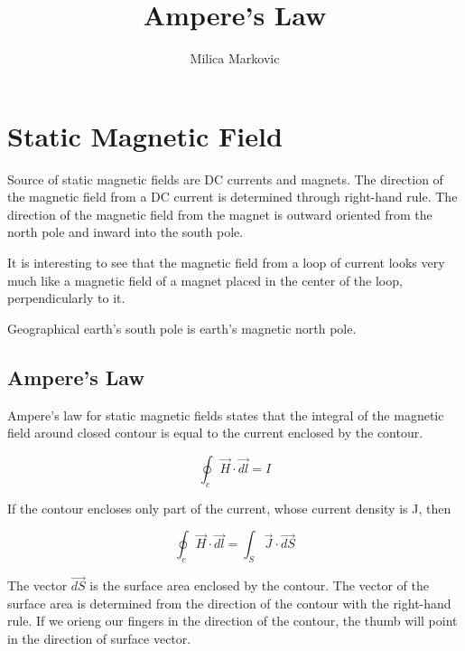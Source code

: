 \documentclass{ximera}
\title{Ampere's Law}
\author{Milica Markovic}
\begin{document}
  
\begin{abstract}  

\end{abstract}  
\maketitle    


\section{Static Magnetic Field}

Source of static magnetic fields are DC currents and magnets. The direction of the magnetic field from a DC current is determined through right-hand rule. The direction of the magnetic field from the magnet is outward oriented from the north pole and inward into the south pole.

It is interesting to see that the magnetic field from a loop of current looks very much like a magnetic field of a magnet placed in the center of the loop, perpendicularly to it. 

Geographical earth's south pole is earth's magnetic north pole.


\subsection{Ampere's Law}


Ampere's law for static magnetic fields states that the integral of the magnetic field around closed contour is equal to the current enclosed by the contour.

\begin{equation}
\oint_c \vec{H} \cdot \vec{dl} = I
\end{equation}


If the contour encloses only part of the current, whose current density is J, then


\begin{equation}
\oint_c \vec{H} \cdot \vec{dl} = \int_S \vec{J} \cdot \vec{dS}
\end{equation}


The vector $\vec{dS}$ is the surface area enclosed by the contour. The vector of the surface area is determined from the direction of the contour with the right-hand rule. If we orieng our fingers in the direction of the contour, the thumb will point in the direction of surface vector.
\end{document}

